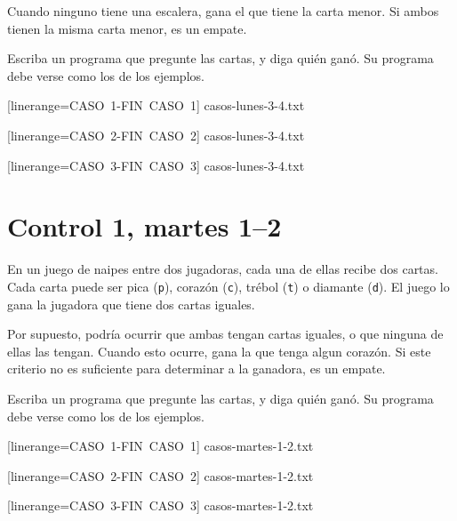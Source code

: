 \documentclass[12pt,spanish,a5paper,landscape]{article}
\begin{document}
  Cuando ninguno tiene una escalera,
  gana el que tiene la carta menor.
  Si ambos tienen la misma carta menor, es un empate.

  Escriba un programa que pregunte las cartas,
  y diga quién ganó.
  Su programa debe verse como los de los ejemplos.

  \begin{minipage}{0.25\textwidth}
      [linerange=CASO\ 1-FIN\ CASO\ 1]%
      {casos-lunes-3-4.txt}
  \end{minipage}
  \hspace{1em}
  \begin{minipage}{0.25\textwidth}
      [linerange=CASO\ 2-FIN\ CASO\ 2]%
      {casos-lunes-3-4.txt}
  \end{minipage}
  \hspace{1em}
  \begin{minipage}{0.25\textwidth}
      [linerange=CASO\ 3-FIN\ CASO\ 3]%
      {casos-lunes-3-4.txt}
  \end{minipage}

  \newpage
  \part*{Control 1, martes 1--2}
  \newpage

  En un juego de naipes entre dos jugadoras,
  cada una de ellas recibe dos cartas.
  Cada carta puede ser
  pica (\verb+p+),
  corazón (\verb+c+),
  trébol (\verb+t+) o
  diamante (\verb+d+).
  El juego lo gana la jugadora que tiene dos cartas iguales.

  Por supuesto,
  podría ocurrir que ambas tengan cartas iguales,
  o que ninguna de ellas las tengan.
  Cuando esto ocurre, gana la que tenga algun corazón.
  Si este criterio no es suficiente para determinar a la ganadora,
  es un empate.

  Escriba un programa que pregunte las cartas,
  y diga quién ganó.
  Su programa debe verse como los de los ejemplos.

  \begin{minipage}{0.25\textwidth}
      [linerange=CASO\ 1-FIN\ CASO\ 1]%
      {casos-martes-1-2.txt}
  \end{minipage}
  \hspace{1em}
  \begin{minipage}{0.25\textwidth}
      [linerange=CASO\ 2-FIN\ CASO\ 2]%
      {casos-martes-1-2.txt}
  \end{minipage}
  \hspace{1em}
  \begin{minipage}{0.25\textwidth}
      [linerange=CASO\ 3-FIN\ CASO\ 3]%
      {casos-martes-1-2.txt}
  \end{minipage}
\end{document}
